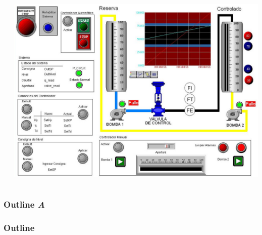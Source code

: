 \begin{frame}
\begin{columns}
\begin{column}{.5\textwidth}
	  \end{column}
	  \begin{column}{.5\textwidth}
	  \centering
	  \includegraphics[height=.65\textwidth]
{../Informe/Cap5-SCADA/images/hmiScada.jpeg}
	  \end{column}
	  \end{columns}
\end{frame}

\begin{frame}
	\ifdebug
	\frametitle{Outline\hfill{\color{red} \emph{A}}}
	\else
	\frametitle{Outline}
	\fi

    \tableofcontents
\end{frame}
